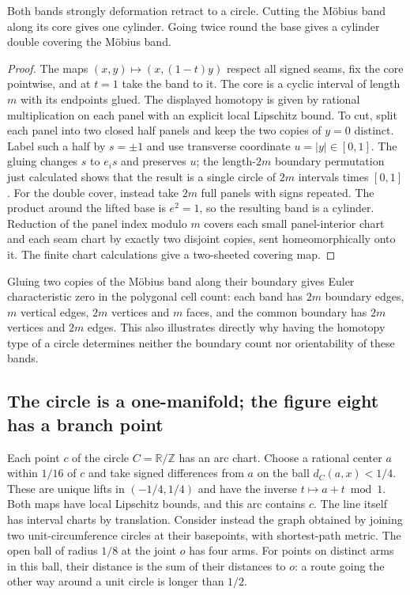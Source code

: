 \begin{proposition}\label{idx-ribbon11}
Both bands strongly deformation retract to a circle. Cutting the Möbius band along its core gives one cylinder. Going twice round the base gives a cylinder double covering the Möbius band.
\end{proposition}
\begin{proof}
The maps $(x,y)\mapsto(x,(1-t)y)$ respect all signed seams, fix the core pointwise, and at $t=1$ take the band to it. The core is a cyclic interval of length $m$ with its endpoints glued. The displayed homotopy is given by rational multiplication on each panel with an explicit local Lipschitz bound. To cut, split each panel into two closed half panels and keep the two copies of $y=0$ distinct. Label such a half by $s=\pm1$ and use transverse coordinate $u=|y|\in[0,1]$. The gluing changes $s$ to $e_i s$ and preserves $u$; the length-$2m$ boundary permutation just calculated shows that the result is a single circle of $2m$ intervals times $[0,1]$. For the double cover, instead take $2m$ full panels with signs repeated. The product around the lifted base is $e^2=1$, so the resulting band is a cylinder. Reduction of the panel index modulo $m$ covers each small panel-interior chart and each seam chart by exactly two disjoint copies, sent homeomorphically onto it. The finite chart calculations give a two-sheeted covering map.
\end{proof}

Gluing two copies of the Möbius band along their boundary gives Euler characteristic zero in the polygonal cell count: each band has $2m$ boundary edges, $m$ vertical edges, $2m$ vertices and $m$ faces, and the common boundary has $2m$ vertices and $2m$ edges. This also illustrates directly why having the homotopy type of a circle determines neither the boundary count nor orientability of these bands.

\subsection{The circle is a one-manifold; the figure eight has a branch point}
Each point $c$ of the circle $C=\mathbb R/\mathbb Z$ has an arc chart. Choose a rational center $a$ within $1/16$ of $c$ and take signed differences from $a$ on the ball $d_C(a,x)<1/4$. These are unique lifts in $(-1/4,1/4)$ and have the inverse $t\mapsto a+t\bmod1$. Both maps have local Lipschitz bounds, and this arc contains $c$. The line itself has interval charts by translation. Consider instead the graph obtained by joining two unit-circumference circles at their basepoints, with shortest-path metric. The open ball of radius $1/8$ at the joint $o$ has four arms. For points on distinct arms in this ball, their distance is the sum of their distances to $o$: a route going the other way around a unit circle is longer than $1/2$.

